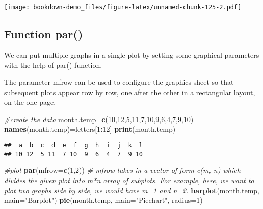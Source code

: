 \documentclass[]{book}
\newenvironment{Shaded}{\begin{snugshade}}{\end{snugshade}}
\newcommand{\KeywordTok}[1]{\textcolor[rgb]{0.13,0.29,0.53}{\textbf{#1}}}
\newcommand{\DataTypeTok}[1]{\textcolor[rgb]{0.13,0.29,0.53}{#1}}
\newcommand{\DecValTok}[1]{\textcolor[rgb]{0.00,0.00,0.81}{#1}}
\newcommand{\StringTok}[1]{\textcolor[rgb]{0.31,0.60,0.02}{#1}}
\newcommand{\CommentTok}[1]{\textcolor[rgb]{0.56,0.35,0.01}{\textit{#1}}}
\newcommand{\OperatorTok}[1]{\textcolor[rgb]{0.81,0.36,0.00}{\textbf{#1}}}
\newcommand{\NormalTok}[1]{#1}
\theoremstyle{definition}
\theoremstyle{definition}
\theoremstyle{definition}
\theoremstyle{remark}
\begin{document}
\texttt{[image: bookdown-demo\_files/figure-latex/unnamed-chunk-125-2.pdf]}

\subsection{Function par()}\label{function-par-1}

We can put multiple graphs in a single plot by setting some graphical
parameters with the help of par() function.

The parameter mfrow can be used to configure the graphics sheet so that
subsequent plots appear row by row, one after the other in a rectangular
layout, on the one page.

\begin{Shaded}
\begin{Highlighting}[]
\CommentTok{#create the data}
\NormalTok{month.temp=}\KeywordTok{c}\NormalTok{(}\DecValTok{10}\NormalTok{,}\DecValTok{12}\NormalTok{,}\DecValTok{5}\NormalTok{,}\DecValTok{11}\NormalTok{,}\DecValTok{7}\NormalTok{,}\DecValTok{10}\NormalTok{,}\DecValTok{9}\NormalTok{,}\DecValTok{6}\NormalTok{,}\DecValTok{4}\NormalTok{,}\DecValTok{7}\NormalTok{,}\DecValTok{9}\NormalTok{,}\DecValTok{10}\NormalTok{)}
\KeywordTok{names}\NormalTok{(month.temp)=letters[}\DecValTok{1}\OperatorTok{:}\DecValTok{12}\NormalTok{]}
\KeywordTok{print}\NormalTok{(month.temp)}
\end{Highlighting}
\end{Shaded}

\begin{verbatim}
##  a  b  c  d  e  f  g  h  i  j  k  l 
## 10 12  5 11  7 10  9  6  4  7  9 10
\end{verbatim}

\begin{Shaded}
\begin{Highlighting}[]
\CommentTok{#plot}
\KeywordTok{par}\NormalTok{(}\DataTypeTok{mfrow=}\KeywordTok{c}\NormalTok{(}\DecValTok{1}\NormalTok{,}\DecValTok{2}\NormalTok{))    }\CommentTok{# mfrow takes in a vector of form c(m, n) which divides the given plot into m*n array of subplots. For example, here, we want to plot two graphs side by side, we would have m=1 and n=2. }
\KeywordTok{barplot}\NormalTok{(month.temp, }\DataTypeTok{main=}\StringTok{"Barplot"}\NormalTok{)}
\KeywordTok{pie}\NormalTok{(month.temp, }\DataTypeTok{main=}\StringTok{"Piechart"}\NormalTok{, }\DataTypeTok{radius=}\DecValTok{1}\NormalTok{)}
\end{Highlighting}
\end{Shaded}
\end{document}
